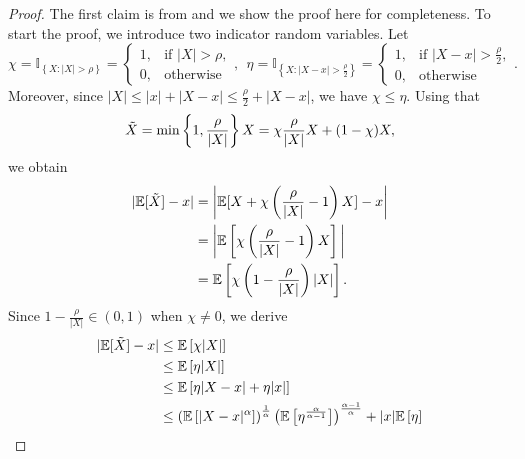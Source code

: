 \documentclass{article} %
\numberwithin{equation}{section}
\begin{document}
\begin{proof}
    The first claim is from \citep{pmlr-v202-sadiev23a} and we show the proof here for completeness. 
    To start the proof, we introduce two indicator random variables. Let 
    \begin{equation}
        \chi = \mathbb{I}_{\left\{X: |X| > \rho\right\}} = \begin{cases} 1, & \text{if } |X| > \rho,\\ 0, & \text{otherwise}\end{cases},~~\eta = \mathbb{I}_{\left\{X: |X-x| > \frac{\rho}{2}\right\}} = \begin{cases} 1, & \text{if } |X - x| > \frac{\rho}{2},\\ 0, & \text{otherwise}\end{cases}.
    \end{equation}
    Moreover, since $|X| \leq |x| + |X-x| \leq \frac{\rho}{2} + |X-x|$, we have $\chi \leq \eta$. Using that
    \begin{equation}
        \Tilde{X} = \min\left\{1,\frac{\rho}{|X|}\right\}X = \chi \frac{\rho}{|X|} X + (1-\chi)X,
    \end{equation}
    we obtain 
    \begin{equation}
        \begin{aligned}
            |\mathbb{E}[\Tilde{X}] -x| 
            &= \bigg|\mathbb{E}[X + \chi \left(\frac{\rho}{|X|}-1\right) X] -x\bigg| \\
            &= \bigg|\mathbb{E}\left[\chi \left(\frac{\rho}{|X|}-1\right) X\right] \bigg| \\
            &= \mathbb{E}\left[\chi \left(1-\frac{\rho}{|X|}\right)|X|\right].
        \end{aligned}
    \end{equation}
    Since $1-\frac{\rho}{|X|}\in (0,1)$ when $\chi \neq 0$, we derive
    \begin{equation}
        \begin{aligned}
            |\expect [\Tilde{X}] -x| 
            &\leq \expect\left[\chi |X|\right]\\
            &\leq \expect\left[\eta |X|\right]\\
            &\leq \expect\left[\eta |X-x| + \eta |x|\right]\\
            &\leq \left(\expect\left[|X-x|^{\alpha}\right]\right)^{\frac{1}{\alpha}}\left(\expect\left[\eta^{\frac{\alpha}{\alpha - 1}}\right]\right)^{\frac{\alpha - 1}{\alpha}} + |x|\expect\left[\eta\right]\\

\end{aligned}
\end{equation}
\end{proof}
\end{document}
